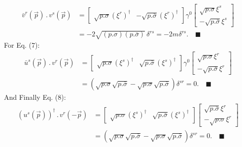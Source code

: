 \documentclass{article}
\newcommand{\vecp}{\vec{p}}
\begin{document}
\begin{equation}
    \begin{split}
        \bar{v}^r(\vecp)\, . \, v^s(\vecp) &= \begin{bmatrix}
            \sqrt{p.\sigma}(\xi^r)^\dagger & -\sqrt{p.\bar{\sigma}}(\xi^r)^\dagger
        \end{bmatrix}\gamma^0\begin{bmatrix}
            \sqrt{p.\sigma}\xi^s \\ -\sqrt{p.\bar{\sigma}}\xi^s
        \end{bmatrix} \\
        &= -2\sqrt{(p.\sigma)(p.\bar{\sigma})}\, \delta^{rs}=-2m \delta^{rs}.\quad \blacksquare
    \end{split}
\end{equation}
For Eq. (7):
\begin{equation}
    \begin{split}
        \bar{u}^s(\vecp)\, . \, v^r(\vecp) &= \begin{bmatrix}
            \sqrt{p.\sigma}(\xi^s)^\dagger & \sqrt{p.\bar{\sigma}}(\xi^s)^\dagger
        \end{bmatrix}\gamma^0 \begin{bmatrix}
            \sqrt{p.\sigma}\xi^r \\ -\sqrt{p.\bar{\sigma}}\xi^r
        \end{bmatrix} \\
        & = (\sqrt{p.\sigma}\sqrt{p.\bar{\sigma}}-\sqrt{p.\sigma}\sqrt{p.\bar{\sigma}})\delta^{sr} = 0. \quad \blacksquare
    \end{split}
\end{equation}
And Finally Eq. (8):
\begin{equation}
    \begin{split}
       (u^s(\vecp))^\dagger\, . \, v^r(-\vecp) &= \begin{bmatrix}
            \sqrt{p.\sigma}(\xi^s)^\dagger & \sqrt{p.\bar{\sigma}}(\xi^s)^\dagger
        \end{bmatrix} \begin{bmatrix}
            \sqrt{p.\bar{\sigma}}\xi^r \\ -\sqrt{p.\sigma}\xi^r
        \end{bmatrix} \\
        & = (\sqrt{p.\sigma}\sqrt{p.\bar{\sigma}}-\sqrt{p.\sigma}\sqrt{p.\bar{\sigma}})\delta^{sr} = 0. \quad \blacksquare
    \end{split}
\end{equation}
\end{document}
